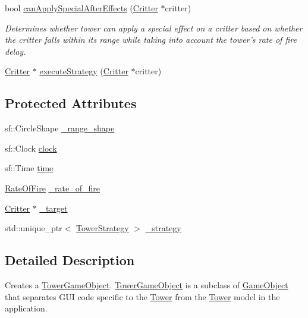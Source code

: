 \begin{DoxyCompactItemize}
bool \hyperlink{class_tower_game_object_a92b1f8a95c7792bd9924d4f1286e3ddb}{can\+Apply\+Special\+After\+Effects} (\hyperlink{class_critter}{Critter} $\ast$critter)
\begin{DoxyCompactList}\small\item\em Determines whether tower can apply a special effect on a critter based on whether the critter falls within its range while taking into account the tower's rate of fire delay. \end{DoxyCompactList}\item 
\hyperlink{class_critter}{Critter} $\ast$ \hyperlink{class_tower_game_object_a266f033caefadecb2f76e434ae75a92f}{execute\+Strategy} (\hyperlink{class_critter}{Critter} $\ast$critter)
\end{DoxyCompactItemize}
\subsection*{Protected Attributes}
\begin{DoxyCompactItemize}
\item 
sf\+::\+Circle\+Shape \hyperlink{class_tower_game_object_a3c154fe0b6a056540332b0c40d60304f}{\+\_\+range\+\_\+shape}
\item 
sf\+::\+Clock \hyperlink{class_tower_game_object_a5c5f8162877828c20bf937c90338205c}{clock}
\item 
sf\+::\+Time \hyperlink{class_tower_game_object_ade7e1ea2089b38f90fa3920a80a3619a}{time}
\item 
\hyperlink{class_tower_game_object_a6a687237ad352e41acb35f8b4cf25fa3}{Rate\+Of\+Fire} \hyperlink{class_tower_game_object_a791d99099306673e85ed6b93fd6f7b1b}{\+\_\+rate\+\_\+of\+\_\+fire}
\item 
\hyperlink{class_critter}{Critter} $\ast$ \hyperlink{class_tower_game_object_a6709e0f4ef86d852d98280a37dbc77bd}{\+\_\+target}
\item 
std\+::unique\+\_\+ptr$<$ \hyperlink{class_tower_strategy}{Tower\+Strategy} $>$ \hyperlink{class_tower_game_object_aa9eaa9739981280ef9ecebc0d5158205}{\+\_\+strategy}
\end{DoxyCompactItemize}


\subsection{Detailed Description}
Creates a \hyperlink{class_tower_game_object}{Tower\+Game\+Object}. \hyperlink{class_tower_game_object}{Tower\+Game\+Object} is a subclass of \hyperlink{class_game_object}{Game\+Object} that separates G\+U\+I code specific to the \hyperlink{class_tower}{Tower} from the \hyperlink{class_tower}{Tower} model in the application. 

